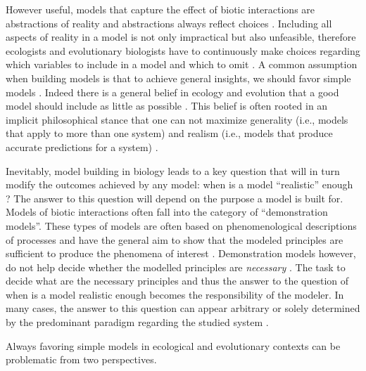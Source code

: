 \documentclass[12pt]{article}
\begin{document}
However useful, models that capture the effect of biotic interactions are abstractions of reality and abstractions always reflect choices \citep{levins2006strategies}. Including all aspects of reality in a model is not only impractical but also unfeasible, therefore ecologists and evolutionary biologists have to continuously make choices regarding which variables to include in a model and which to omit \citep{evans2012predictive}. A common assumption when building models is that to achieve general insights, we should favor simple models \citep{evans2013simple}. Indeed there is a general belief in ecology and evolution that a good model should include as little as possible \citep{evans2013simple,orzack2012philosophy}. This belief is often rooted in an implicit philosophical stance that one can not maximize generality (i.e., models that apply to more than one system) and realism (i.e., models that produce accurate predictions for a system) \citep{levins2006strategies,evans2012predictive}.


Inevitably, model building in biology leads to a key question that will in turn modify the outcomes achieved by any model: when is a model ``realistic'' enough \citep{stouffer2019all}? The answer to this question will depend on the purpose a model is built for. Models of biotic interactions often fall into the category of ``demonstration models''. These types of models are often based on phenomenological descriptions of processes and have the general aim to show that the modeled principles are sufficient to produce the phenomena of interest \citep{evans2013simple}.  Demonstration models however, do not help decide whether the modelled principles are \textit{necessary} \citep{evans2013simple}. The task to decide what are the necessary principles and thus the answer to the question of when is a model realistic enough becomes the responsibility of the modeler. In many cases, the answer to this question can appear arbitrary or solely determined by the predominant paradigm regarding the studied system \citep{holland2006comment,bascompte2006response,aladwani2019addition,martyn2021identifying}.


Always favoring simple models in ecological and evolutionary contexts can be problematic from two perspectives. 

\end{document}
